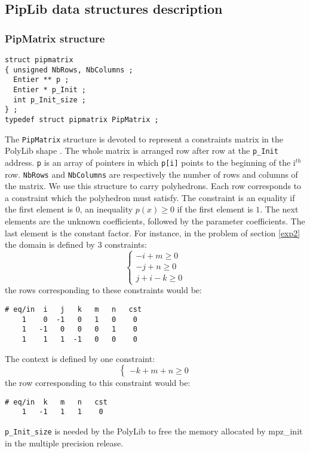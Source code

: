 \documentclass[12pt,a4paper,dvips]{article}
\begin{document}
\subsection{PipLib data structures description}\label{PipLibdata}
\subsubsection{PipMatrix structure}
\begin{verbatim}
struct pipmatrix
{ unsigned NbRows, NbColumns ;
  Entier ** p ;
  Entier * p_Init ;
  int p_Init_size ;
} ;
typedef struct pipmatrix PipMatrix ;
\end{verbatim}
The {\tt PipMatrix} structure is devoted to represent a constraints matrix in the
PolyLib shape \cite{Wild:93}. The whole matrix is arranged row after row at the
{\tt p\_Init} address. {\tt p} is an array of pointers in which
{\tt p[i]} points to the beginning of the i$^{th}$ row.
{\tt NbRows} and {\tt NbColumns} are respectively the number of
rows and columns of the matrix. We use this structure to carry polyhedrons.
Each row corresponds to a constraint which the polyhedron must satisfy. The
constraint is an equality if the first element is $0$, an inequality 
$p(x) \geq 0$ if the first element is $1$. The next elements are
the unknown coefficients, followed by the parameter coefficients.
The last element is the constant factor.
For instance, in the problem of section \ref{exp2} the domain is defined by 3
constraints:
\begin{displaymath}
\left\{
\begin{array}{l}
-i + m \geq 0\\
-j + n \geq 0\\
j + i - k \geq 0
\end{array}
\right.
\end{displaymath}
the rows corresponding to these constraints would be:
\begin{verbatim}
# eq/in  i   j   k   m   n   cst
    1    0  -1   0   1   0    0 
    1   -1   0   0   0   1    0 
    1    1   1  -1   0   0    0 
\end{verbatim}
The context is defined by one constraint:
\begin{displaymath}
\left\{
\begin{array}{l}
-k + m + n \geq 0
\end{array}
\right.
\end{displaymath}
the row corresponding to this constraint would be:
\begin{verbatim}
# eq/in  k   m   n   cst
    1   -1   1   1    0 
\end{verbatim}
{\tt p\_Init\_size} is needed by the PolyLib to free the memory allocated by
mpz\_init in the multiple precision release.
\end{document}
